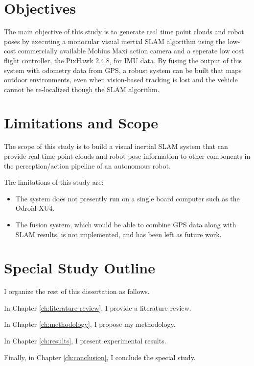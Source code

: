 \section{Objectives}

The main objective of this study is to generate real time point clouds and robot poses by executing a monocular visual inertial SLAM algorithm using the low-cost commercially available Mobius Maxi action camera and a seperate low cost flight controller, the PixHawk 2.4.8, for IMU data. By fusing the output of this system with odometry data from GPS, a robust system can be built that maps outdoor environments, even when vision-based tracking is lost and the vehicle cannot be re-localized though the SLAM algorithm.

\section{Limitations and Scope}

The scope of this study is to build a visual inertial SLAM system that can provide real-time point clouds and robot pose information to other components in the perception/action pipeline of an autonomous robot.

The limitations of this study are:

\begin{itemize}
	\item The system does not presently run on a single board computer such as the Odroid XU4. 
	\item The fusion system, which would be able to combine GPS data along with SLAM results, is not implemented, and has been left as future work.
\end{itemize}

\section{Special Study Outline}

I organize the rest of this dissertation as follows.

In Chapter \ref{ch:literature-review}, I provide a literature review.

In Chapter \ref{ch:methodology}, I propose my methodology.

In Chapter \ref{ch:results}, I present experimental results.

Finally, in Chapter \ref{ch:conclusion}, I conclude the special study.

\FloatBarrier
